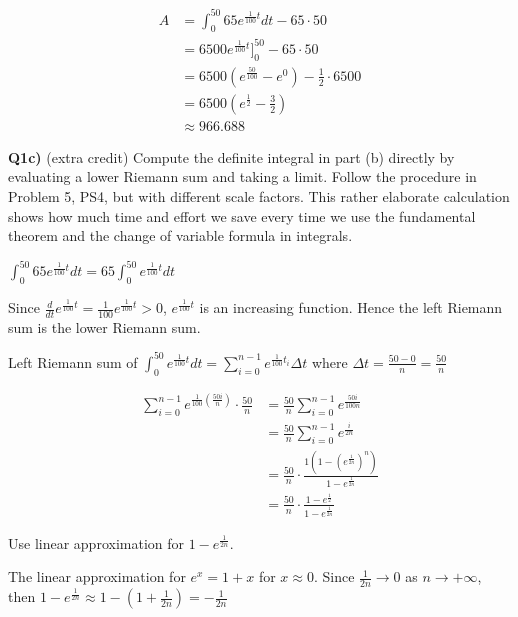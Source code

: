 \documentclass[9pt]{article}
\begin{document}
\begin{align*}
  A &= \int_0^{50} 65 e^{\frac{1}{100}t} dt - 65 \cdot 50 \\
  &= 6500e^{\frac{1}{100}t}\bigg]_0^{50} - 65 \cdot 50 \\
  &= 6500 (e^{\frac{50}{100}} - e^{0}) - \frac{1}{2} \cdot 6500 \\
  &= 6500 (e^{\frac{1}{2}} - \frac{3}{2}) \\
  &\approx 966.688
\end{align*}


\begin{tcolorbox}
  \textbf{Q1c)} (extra credit) Compute the definite integral in part (b) directly by evaluating a lower Riemann sum and taking a limit. Follow the procedure in Problem 5, PS4, but with different scale factors. This rather elaborate calculation shows how much time and effort we save every time we use the fundamental theorem and the change of variable formula in integrals.
\end{tcolorbox}

\begin{center}
  $\int_0^{50} 65 e^{\frac{1}{100}t} dt = 65 \int_0^{50} e^{\frac{1}{100}t} dt$
\end{center}

Since $\frac{d}{dt} e^{\frac{1}{100}t} = \frac{1}{100} e^{\frac{1}{100}t} > 0$, $e^{\frac{1}{100}t}$ is an increasing function. Hence the left Riemann sum is the lower Riemann sum.

Left Riemann sum of $\int_0^{50} e^{\frac{1}{100}t} dt = \sum\limits_{i=0}^{n-1} e^{\frac{1}{100}t_i} \Delta t$ where $\Delta t = \frac{50 - 0}{n} = \frac{50}{n}$

\begin{align*}
  \sum\limits_{i=0}^{n-1} e^{\frac{1}{100}(\frac{50i}{n})} \cdot \frac{50}{n} &= \frac{50}{n} \sum\limits_{i=0}^{n-1} e^{\frac{50i}{100n}} \\
  &= \frac{50}{n} \sum\limits_{i=0}^{n-1} e^{\frac{i}{2n}} \\
  &= \frac{50}{n} \cdot \frac{1(1 - (e^{\frac{1}{2n}})^n)}{1 - e^{\frac{1}{2n}}} \\
  &= \frac{50}{n} \cdot \frac{1 - e^{\frac{1}{2}}}{1 - e ^{\frac{1}{2n}}}
\end{align*}

Use linear approximation for $1 - e^{\frac{1}{2n}}$.

The linear approximation for $e^x = 1 + x$ for $x \approx 0$. Since $\frac{1}{2n} \rightarrow 0$ as $n \rightarrow +\infty$, then $1 - e^{\frac{1}{2n}} \approx 1 - (1 + \frac{1}{2n}) = -\frac{1}{2n}$
\end{document}
